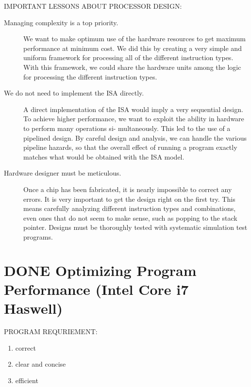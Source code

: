 \documentclass[11pt]{article}
\begin{document}
IMPORTANT LESSONS ABOUT PROCESSOR DESIGN:\\
\begin{description}
\item[{Managing complexity is a top priority.}] We want to make optimum use of the hardware resources to get maximum performance at minimum cost. We did this by creating a very simple and uniform framework for processing all of the different instruction types. With this framework, we could share the hardware units among the logic for processing the different instruction types.\\
\item[{We do not need to implement the ISA directly.}] A direct implementation of the ISA would imply a very sequential design. To achieve higher performance, we want to exploit the ability in hardware to perform many operations si- multaneously. This led to the use of a pipelined design. By careful design and analysis, we can handle the various pipeline hazards, so that the overall effect of running a program exactly matches what would be obtained with the ISA model.\\
\item[{Hardware designer must be meticulous.}] Once a chip has been fabricated, it is nearly impossible to correct any errors. It is very important to get the design right on the first try. This means carefully analyzing different instruction types and combinations, even ones that do not seem to make sense, such as popping to the stack pointer. Designs must be thoroughly tested with systematic simulation test programs.\\
\end{description}


\section{{\bfseries\sffamily DONE} Optimizing Program Performance (Intel Core i7 Haswell)}
\label{sec:org3988093}

PROGRAM REQURIEMENT:\\
\begin{enumerate}
\item correct\\
\item clear and concise\\
\item efficient\\
\end{enumerate}
\end{document}
